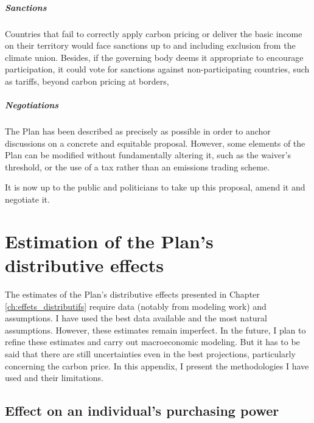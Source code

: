 \documentclass[a5paper,english,openany]{memoir}
\begin{document}
\paragraph{Sanctions}

Countries that fail to correctly apply carbon pricing or deliver the basic income on their territory would face sanctions up to and including exclusion from the climate union. 
Besides, if the governing body deems it appropriate to encourage participation, it could vote for sanctions against non-participating countries, such as tariffs, beyond carbon pricing at borders, %

\paragraph{Negotiations}

The Plan has been described as precisely as possible in order to anchor discussions on a concrete and equitable proposal. However, some elements of the Plan can be modified without fundamentally altering it, such as the waiver's threshold, or the use of a tax rather than an emissions trading scheme. 

It is now up to the public and politicians to take up this proposal, amend it and negotiate it.



\chapter{Estimation of the Plan's distributive effects}\label{ch:methodo}

The estimates of the Plan's distributive effects presented in Chapter \ref{ch:effets_distributifs} require data (notably from modeling %
work) and assumptions. 
I have used the best data available and the most natural assumptions. However, these estimates remain imperfect. In the future, I plan to refine these estimates and carry out macroeconomic modeling. %
But it has to be said that there are still uncertainties even in the best projections, particularly concerning the carbon price. 
In this appendix, I present the methodologies I have used and their limitations.

\section{Effect on an individual's purchasing power}\label{app:indiv}
\end{document}
